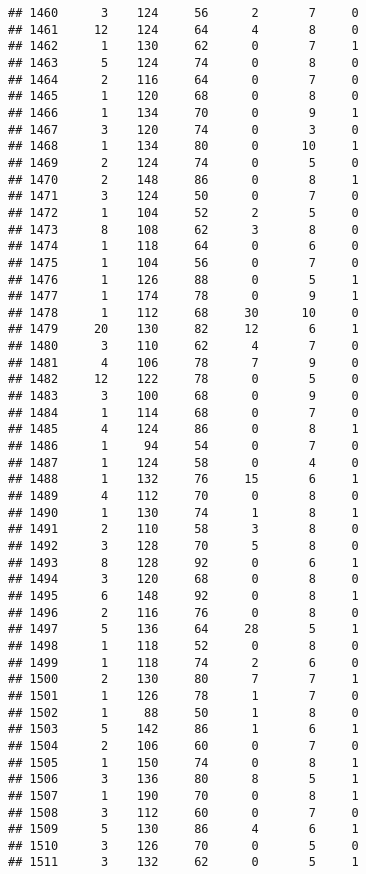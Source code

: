 \documentclass[
]{article}
\begin{document}
\begin{verbatim}
## 1460      3    124     56      2       7     0
## 1461     12    124     64      4       8     0
## 1462      1    130     62      0       7     1
## 1463      5    124     74      0       8     0
## 1464      2    116     64      0       7     0
## 1465      1    120     68      0       8     0
## 1466      1    134     70      0       9     1
## 1467      3    120     74      0       3     0
## 1468      1    134     80      0      10     1
## 1469      2    124     74      0       5     0
## 1470      2    148     86      0       8     1
## 1471      3    124     50      0       7     0
## 1472      1    104     52      2       5     0
## 1473      8    108     62      3       8     0
## 1474      1    118     64      0       6     0
## 1475      1    104     56      0       7     0
## 1476      1    126     88      0       5     1
## 1477      1    174     78      0       9     1
## 1478      1    112     68     30      10     0
## 1479     20    130     82     12       6     1
## 1480      3    110     62      4       7     0
## 1481      4    106     78      7       9     0
## 1482     12    122     78      0       5     0
## 1483      3    100     68      0       9     0
## 1484      1    114     68      0       7     0
## 1485      4    124     86      0       8     1
## 1486      1     94     54      0       7     0
## 1487      1    124     58      0       4     0
## 1488      1    132     76     15       6     1
## 1489      4    112     70      0       8     0
## 1490      1    130     74      1       8     1
## 1491      2    110     58      3       8     0
## 1492      3    128     70      5       8     0
## 1493      8    128     92      0       6     1
## 1494      3    120     68      0       8     0
## 1495      6    148     92      0       8     1
## 1496      2    116     76      0       8     0
## 1497      5    136     64     28       5     1
## 1498      1    118     52      0       8     0
## 1499      1    118     74      2       6     0
## 1500      2    130     80      7       7     1
## 1501      1    126     78      1       7     0
## 1502      1     88     50      1       8     0
## 1503      5    142     86      1       6     1
## 1504      2    106     60      0       7     0
## 1505      1    150     74      0       8     1
## 1506      3    136     80      8       5     1
## 1507      1    190     70      0       8     1
## 1508      3    112     60      0       7     0
## 1509      5    130     86      4       6     1
## 1510      3    126     70      0       5     0
## 1511      3    132     62      0       5     1

\end{verbatim}
\end{document}

